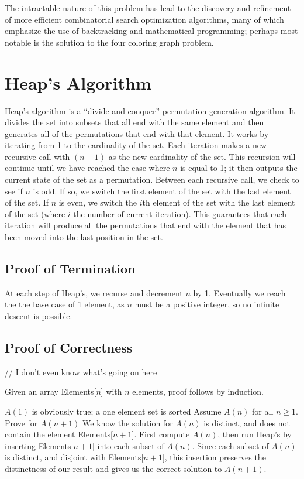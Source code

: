 \documentclass[10pt, oneside]{article}   	%
\begin{document}
The intractable nature of this problem has lead to the discovery and refinement of more efficient combinatorial search optimization algorithms, many of which emphasize the use of backtracking and mathematical programming; perhaps most notable is the solution to the four coloring graph problem.  

\section{Heap's Algorithm}
Heap's algorithm is a ``divide-and-conquer'' permutation generation algorithm. It divides the set into subsets that all end with the same element and then generates all of the permutations that end with that element. It works by iterating from 1 to the cardinality of the set. Each iteration makes a new recursive call with $(n - 1)$ as the new cardinality of the set. This recursion will continue until we have reached the case where $n$ is equal to 1; it then outputs the current state of the set as a permutation. Between each recursive call, we check to see if $n$ is odd. If so, we switch the first element of the set with the last element of the set. If $n$ is even, we switch the $i$th element of the set with the last element of the set (where $i$ the number of current iteration). This guarantees that each iteration will produce all the permutations that end with the element that has been moved into the last position in the set.
\subsection{Proof of Termination}

At each step of Heap's, we recurse and decrement $n$ by 1. Eventually we reach the the base case of 1 element, as $n$ must be a positive integer, so no infinite descent is possible.

\subsection{Proof of Correctness}

// I don't even know what's going on here

Given an array Elements[$n$] with $n$ elements, proof follows by induction.

$A(1)$ is obviously true; a one element set is sorted
Assume $A(n)$ for all $n \geq 1$.
Prove for $A(n+1)$
We know the solution for $A(n)$ is distinct, and does not contain the element Elements[$n+1$]. First compute $A(n)$, then run Heap's by inserting Elements[$n+1$] into each subset of $A(n)$. Since each subset of $A(n)$ is distinct, and disjoint with Elements[$n+1$], this insertion preserves the distinctness of our result and gives us the correct solution to $A(n+1)$.
\end{document}
